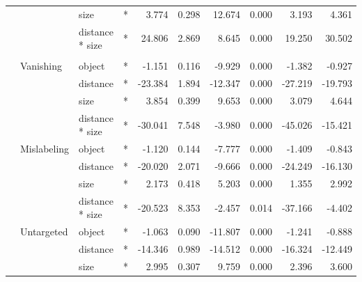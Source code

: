 \documentclass[
]{article}
\begin{document}
\begin{longtable}[t]{llllrrrrrr}
\cmidrule{3-10}\nopagebreak
\hspace{1em} &  & size & * & 3.774 & 0.298 & 12.674 & 0.000 & 3.193 & 4.361\\
\cmidrule{3-10}\nopagebreak
\hspace{1em} &  & distance * size & * & 24.806 & 2.869 & 8.645 & 0.000 & 19.250 & 30.502\\
\cmidrule{1-10}\pagebreak[0]
\addlinespace[0.3em]
\multicolumn{10}{l}{\textbf{Faster R-CNN}}\\
\hspace{1em} & Vanishing & object & * & -1.151 & 0.116 & -9.929 & 0.000 & -1.382 & -0.927\\
\cmidrule{3-10}\nopagebreak
\hspace{1em} &  & distance & * & -23.384 & 1.894 & -12.347 & 0.000 & -27.219 & -19.793\\
\cmidrule{3-10}\nopagebreak
\hspace{1em} &  & size & * & 3.854 & 0.399 & 9.653 & 0.000 & 3.079 & 4.644\\
\cmidrule{3-10}\nopagebreak
\hspace{1em} &  & distance * size & * & -30.041 & 7.548 & -3.980 & 0.000 & -45.026 & -15.421\\
\cmidrule{2-10}\nopagebreak
\hspace{1em} & Mislabeling & object & * & -1.120 & 0.144 & -7.777 & 0.000 & -1.409 & -0.843\\
\cmidrule{3-10}\nopagebreak
\hspace{1em} &  & distance & * & -20.020 & 2.071 & -9.666 & 0.000 & -24.249 & -16.130\\
\cmidrule{3-10}\nopagebreak
\hspace{1em} &  & size & * & 2.173 & 0.418 & 5.203 & 0.000 & 1.355 & 2.992\\
\cmidrule{3-10}\nopagebreak
\hspace{1em} &  & distance * size & * & -20.523 & 8.353 & -2.457 & 0.014 & -37.166 & -4.402\\
\cmidrule{2-10}\nopagebreak
\hspace{1em} & Untargeted & object & * & -1.063 & 0.090 & -11.807 & 0.000 & -1.241 & -0.888\\
\cmidrule{3-10}\nopagebreak
\hspace{1em} &  & distance & * & -14.346 & 0.989 & -14.512 & 0.000 & -16.324 & -12.449\\
\cmidrule{3-10}\nopagebreak
\hspace{1em} &  & size & * & 2.995 & 0.307 & 9.759 & 0.000 & 2.396 & 3.600\\

\end{longtable}
\end{document}
